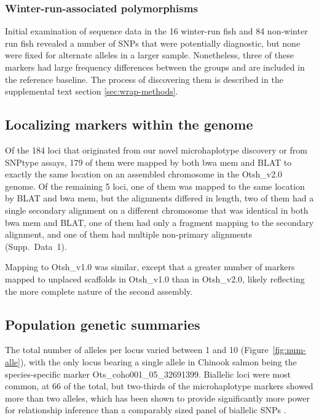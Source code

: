\subsubsection*{Winter-run-associated polymorphisms}

Initial examination of sequence data 
in the 16 winter-run fish and 84 non-winter run fish revealed
a number of SNPs that were potentially diagnostic, but none were fixed for alternate alleles 
in a larger sample.
Nonetheless, three of these markers had large frequency differences
between the groups and are included in the reference baseline.  The process of 
discovering them is described in the supplemental text section \ref{sec:wrap-methods}.

\subsection*{Localizing markers within the genome}

Of the 184 loci that originated from our novel
microhaplotype discovery or from SNPtype assays, 179 of them were mapped by both bwa mem and
BLAT to exactly the same location
on an assembled chromosome in the Otsh\_v2.0 genome.
Of the remaining 5 loci, one of them was mapped to the same location by BLAT and bwa mem, but
the alignments differed in length, two of them had a single secondary alignment on a different chromosome
that was identical in both bwa mem and BLAT, one of them had only a fragment mapping to
the secondary alignment, and one of them had multiple
non-primary alignments (Supp.~Data~1).

Mapping to Otsh\_v1.0 was similar, except that a greater number of markers mapped to unplaced
scaffolds in Otsh\_v1.0 than in Otsh\_v2.0, likely reflecting the more complete nature of the
second assembly.


\subsection*{Population genetic summaries}

The total number of alleles per locus varied between 1 and 10 (Figure~\ref{fig:num-alle}), with the
only locus bearing a single allele in Chinook salmon being the species-specific marker Ots\_coho001\_05\_32691399. 
Biallelic loci were most common, at 66 of the total, but two-thirds of the microhaplotype markers
showed more than two alleles, which has been shown to provide significantly more
power for relationship inference than a comparably sized panel of biallelic SNPs
\citep{baetscher2018microhaplotypes}.



